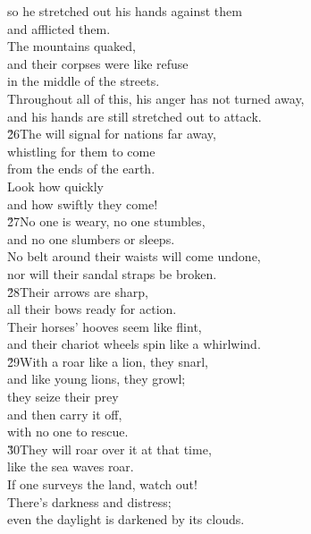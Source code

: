 \begin{poetry}
\poemll    so he stretched out his hands against them \\
\poemlll       and afflicted them. \\
\poeml The mountains quaked, \\
\poemll    and their corpses were like refuse \\
\poemlll       in the middle of the streets. \\
\poeml Throughout all of this, his anger has not turned away, \\
\poemll    and his hands are still stretched out to attack. \\
\poeml \v{26}The  will signal for nations far away, \\
\poemll    whistling for them to come \\
\poemlll       from the ends of the earth. \\
\poeml Look how quickly \\
\poemll    and how swiftly they come! \\
\poeml \v{27}No one is weary, no one stumbles, \\
\poemll    and no one slumbers or sleeps. \\
\poeml No belt around their waists will come undone, \\
\poemll    nor will their sandal straps be broken. \\
\poeml \v{28}Their arrows are sharp, \\
\poemll    all their bows ready for action. \\
\poeml Their horses' hooves seem like flint, \\
\poemll    and their chariot wheels spin like a whirlwind. \\
\poeml \v{29}With a roar like a lion, they snarl, \\
\poemll    and like young lions, they growl; \\
\poeml they seize their prey \\
\poemll    and then carry it off, \\
\poemlll       with no one to rescue. \\
\poeml \v{30}They will roar over it at that time, \\
\poemll    like the sea waves roar. \\
\poeml If one surveys the land, watch out! \\
\poemll    There's darkness and distress; \\
\poemlll       even the daylight is darkened by its clouds.
\end{poetry}

